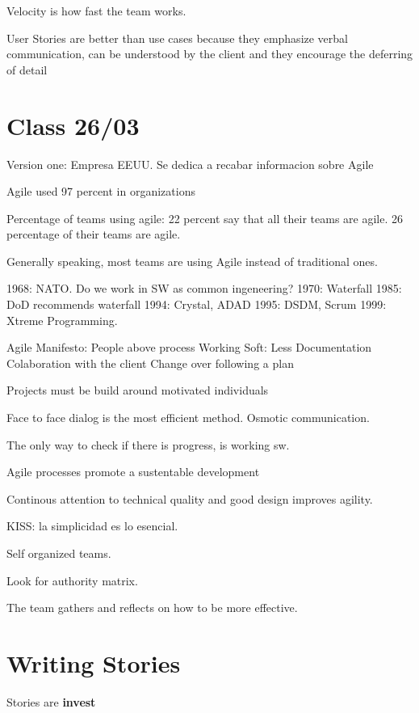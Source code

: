 \documentclass[a4paper,12pt]{article}
\begin{document}
Velocity is how fast the team works.

User Stories are better than use cases because they emphasize verbal communication, can be understood by the client and they encourage the deferring of detail

\section{}
\section{Class 26/03}

Version one: Empresa EEUU. Se dedica a recabar informacion sobre Agile

Agile used 97 percent in organizations

Percentage of teams using agile: 22 percent say that all their teams are agile. 26 percentage of their teams are agile.

Generally speaking, most teams are using Agile instead of traditional ones.

1968: NATO. Do we work in SW as common ingeneering?
1970: Waterfall
1985: DoD recommends waterfall
1994: Crystal, ADAD
1995: DSDM, Scrum
1999: Xtreme Programming.

Agile Manifesto: People above process
Working Soft: Less Documentation
Colaboration with the client
Change over following a plan


Projects must be build around motivated individuals

Face to face dialog is the most efficient method. Osmotic communication.

The only way to check if there is progress, is working sw.

Agile processes promote a sustentable development

Continous attention to technical quality and good design improves agility.

KISS: la simplicidad es lo esencial.

Self organized teams.

Look for authority matrix.

The team gathers and reflects on how to be more effective. 
\section{Writing Stories}

Stories are \textbf{invest}
\end{document}
